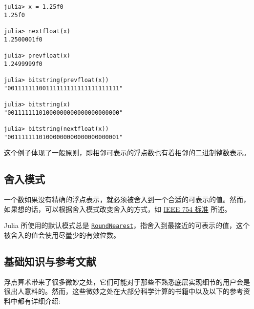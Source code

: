 \begin{verbatim}
julia> x = 1.25f0
1.25f0

julia> nextfloat(x)
1.2500001f0

julia> prevfloat(x)
1.2499999f0

julia> bitstring(prevfloat(x))
"00111111100111111111111111111111"

julia> bitstring(x)
"00111111101000000000000000000000"

julia> bitstring(nextfloat(x))
"00111111101000000000000000000001"
\end{verbatim}



这个例子体现了一般原则，即相邻可表示的浮点数也有着相邻的二进制整数表示。



\hypertarget{5125794393878787955}{}


\subsection{舍入模式}



一个数如果没有精确的浮点表示，就必须被舍入到一个合适的可表示的值。然而，如果想的话，可以根据舍入模式改变舍入的方式，如 \href{https://en.wikipedia.org/wiki/IEEE\_754-2008}{IEEE 754 标准} 所述。 



Julia 所使用的默认模式总是 \hyperlink{868115654703135309}{\texttt{RoundNearest}}，指舍入到最接近的可表示的值，这个被舍入的值会使用尽量少的有效位数。



\hypertarget{6428114724945706317}{}


\subsection{基础知识与参考文献}



浮点算术带来了很多微妙之处，它们可能对于那些不熟悉底层实现细节的用户会是很出人意料的。然而，这些微妙之处在大部分科学计算的书籍中以及以下的参考资料中都有详细介绍:



